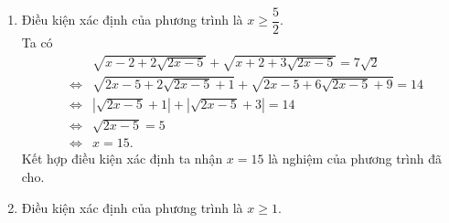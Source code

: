 \begin{bt}
{\begin{enumerate}
			\begin{eqnarray*}
				&& 2x^2+x-3=2\sqrt{2x+3}\\
				&\Leftrightarrow & 4x^2+2x-6=4\sqrt{2x+3}\\
				&\Leftrightarrow & 4x^2+4x+1=2x+3+4\sqrt{2x+3}+4\\
				&\Leftrightarrow & (2x+1)^2=\left(\sqrt{2x+3}+2\right)^2\\
				&\Leftrightarrow & \left[\begin{aligned}&\sqrt{2x+3}+2=2x+1 \\&\sqrt{2x+3}+2=-2x-1 \end{aligned}\right.\\
				&\Leftrightarrow & \left[\begin{aligned}&\left\{\begin{aligned}&x\geq\dfrac{1}{2} \\&4x^2-6x-2=0 \end{aligned}\right. \\&\left\{\begin{aligned}&x\leq -\dfrac{3}{2} \\&4x^2+10x+6 \end{aligned}\right. \end{aligned}\right.\\
				&\Leftrightarrow & \left[\begin{aligned}&x=\dfrac{3+\sqrt{17}}{4} \\&x=-\dfrac{3}{2}. \end{aligned}\right.
			\end{eqnarray*}
			Kết hợp điều kiện xác định và thử lại ta được $x=-\dfrac{3}{2}$ và $x=\dfrac{3+\sqrt{17}}{4}$ là các nghiệm của phương trình đã cho.
			\item Điều kiện xác định của phương trình là $x\geq \dfrac{5}{2}$.\\
			Ta có
			\allowdisplaybreaks
			\begin{eqnarray*}
				&& \sqrt{x-2+2\sqrt{2x-5}} + \sqrt{x+2+3\sqrt{2x-5}} = 7\sqrt{2}\\
				&\Leftrightarrow & \sqrt{2x-5+2\sqrt{2x-5}+1}+\sqrt{2x-5+6\sqrt{2x-5}+9}=14\\
				&\Leftrightarrow & \left|\sqrt{2x-5}+1\right|+\left|\sqrt{2x-5}+3\right|=14\\
				&\Leftrightarrow & \sqrt{2x-5}=5\\
				&\Leftrightarrow & x=15.
			\end{eqnarray*}
			Kết hợp điều kiện xác định ta nhận $x=15$ là nghiệm của phương trình đã cho.
			\item Điều kiện xác định của phương trình là $x\geq 1$.\\

\end{enumerate}}
\end{bt}
